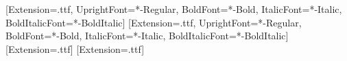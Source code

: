
\usepackage{etoolbox}
\usepackage{xcolor}

\usepackage[no-math]{fontspec}
\setsansfont{Poppins}[Extension=.ttf,
  UprightFont=*-Regular, BoldFont=*-Bold, ItalicFont=*-Italic, BoldItalicFont=*-BoldItalic]
\setmainfont{Poppins}[Extension=.ttf,
  UprightFont=*-Regular, BoldFont=*-Bold, ItalicFont=*-Italic, BoldItalicFont=*-BoldItalic]
\newfontfamily{}[Extension=.ttf]
\newfontfamily{}[Extension=.ttf]


